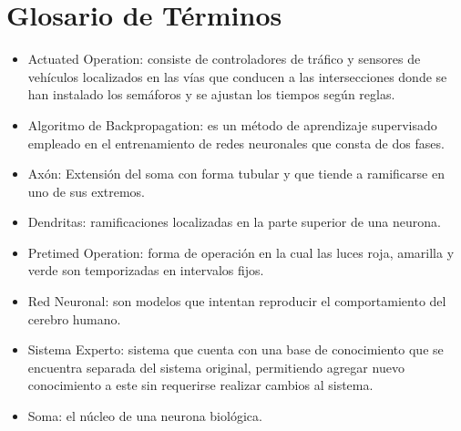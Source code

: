\chapter{Glosario de T\'{e}rminos}
	\label{chap:term}
	
\begin{itemize}
  \item Actuated Operation: consiste de controladores de tr\'{a}fico y sensores de
  veh\'{i}culos localizados en las v\'{i}as que conducen a las intersecciones donde se han instalado los sem\'{a}foros y se ajustan los tiempos seg\'{u}n reglas.
  \item Algoritmo de Backpropagation: es un m\'{e}todo de aprendizaje
  supervisado empleado en el entrenamiento de redes neuronales que consta de dos fases.
  \item Ax\'{o}n: Extensi\'{o}n del soma con forma tubular y que tiende a ramificarse en
  uno de sus extremos.  
  \item Dendritas: ramificaciones localizadas en la parte superior de una
  neurona.  
  \item Pretimed Operation: forma de operaci\'{o}n en la cual las luces roja,
  amarilla y verde son temporizadas en intervalos fijos. 
  \item Red Neuronal: son modelos que intentan reproducir el comportamiento
  del cerebro humano.    
  \item Sistema Experto: sistema que cuenta con una base de conocimiento que se
  encuentra separada del sistema original, permitiendo agregar nuevo conocimiento a este sin requerirse realizar cambios al sistema.
  \item Soma: el n\'{u}cleo de una neurona biol\'{o}gica.
\end{itemize}

